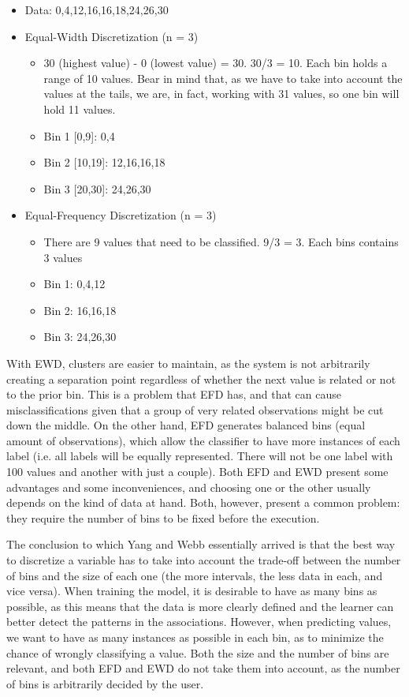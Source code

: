 \documentclass{article}
\begin{document}
\begin{itemize}
  \item Data: 0,4,12,16,16,18,24,26,30
  \item Equal-Width Discretization (n = 3)
  \begin{itemize}
    \item 30 (highest value) - 0 (lowest value) = 30. 30/3 = 10. Each bin holds a range of 10 values. Bear in mind that, as we have to take into account the values at the tails, we are, in fact, working with 31 values, so one bin will hold 11 values.
    \item Bin 1 [0,9]: 0,4
    \item Bin 2 [10,19]: 12,16,16,18
    \item Bin 3 [20,30]: 24,26,30 
  \end{itemize}
\pagebreak{}  

  \item Equal-Frequency Discretization (n = 3)
  \begin{itemize}
    \item There are 9 values that need to be classified. 9/3 = 3. Each bins contains 3 values
    \item Bin 1: 0,4,12
    \item Bin 2: 16,16,18
    \item Bin 3: 24,26,30 
   \end{itemize}
\end{itemize}

With EWD, clusters are easier to maintain, as the system is not arbitrarily creating a separation point regardless of whether the next value is related or not to the prior bin. This is a problem that EFD has, and that can cause misclassifications given that a group of very related observations might be cut down the middle. On the other hand, EFD generates balanced bins (equal amount of observations), which allow the classifier to have more instances of each label (i.e. all labels will be equally represented. There will not be one label with 100 values and another with just a couple). Both EFD and EWD present some advantages and some inconveniences, and choosing one or the other usually depends on the kind of data at hand. Both, however, present a common problem: they require the number of bins to be fixed before the execution.

The conclusion to which Yang and Webb\cite{yang08} essentially arrived is that the best way to discretize a variable has to take into account the trade-off between the number of bins and the size of each one (the more intervals, the less data in each, and vice versa). When training the model, it is desirable to have as many bins as possible, as this means that the data is more clearly defined and the learner can better detect the patterns in the associations. However, when predicting values, we want to have as many instances as possible in each bin, as to minimize the chance of wrongly classifying a value. Both the size and the number of bins are relevant, and both EFD and EWD do not take them into account, as the number of bins is arbitrarily decided by the user.
\end{document}

